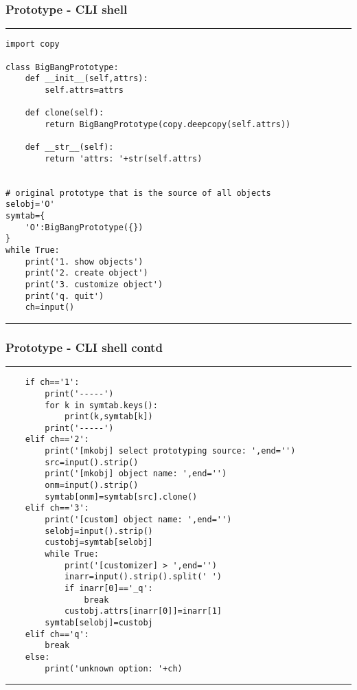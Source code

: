 \documentclass{beamer}
\begin{document}
	\begin{frame}[fragile]
	    \frametitle{Prototype - CLI shell}
	    \rule{\textwidth}{1pt}
	    \scriptsize
	    \begin{verbatim}
import copy

class BigBangPrototype:
    def __init__(self,attrs):
        self.attrs=attrs
    
    def clone(self):
        return BigBangPrototype(copy.deepcopy(self.attrs))
        
    def __str__(self):
        return 'attrs: '+str(self.attrs)


# original prototype that is the source of all objects
selobj='O'
symtab={
    'O':BigBangPrototype({})
}
while True:
    print('1. show objects')
    print('2. create object')
    print('3. customize object')
    print('q. quit')
    ch=input()
	    \end{verbatim}
	    \rule{\textwidth}{1pt}
	\end{frame}
	\begin{frame}[fragile]
	    \frametitle{Prototype - CLI shell contd}
	    \rule{\textwidth}{1pt}
	    \scriptsize
	    \begin{verbatim}
    if ch=='1':
        print('-----')
        for k in symtab.keys():
            print(k,symtab[k])
        print('-----')
    elif ch=='2':
        print('[mkobj] select prototyping source: ',end='')
        src=input().strip()
        print('[mkobj] object name: ',end='')
        onm=input().strip()
        symtab[onm]=symtab[src].clone()
    elif ch=='3':
        print('[custom] object name: ',end='')
        selobj=input().strip()
        custobj=symtab[selobj]
        while True:
            print('[customizer] > ',end='')
            inarr=input().strip().split(' ')
            if inarr[0]=='_q':
                break
            custobj.attrs[inarr[0]]=inarr[1]
        symtab[selobj]=custobj
    elif ch=='q':
        break
    else:
        print('unknown option: '+ch)
	    \end{verbatim}
	    \rule{\textwidth}{1pt}
	\end{frame}
\end{document}
